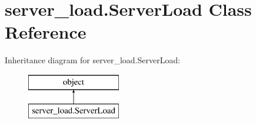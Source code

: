 \hypertarget{classserver__load_1_1_server_load}{\section{server\-\_\-load.\-Server\-Load Class Reference}
\label{classserver__load_1_1_server_load}
}
Inheritance diagram for server\-\_\-load.\-Server\-Load\-:\begin{figure}[H]
\begin{center}
\leavevmode
\includegraphics[height=2.000000cm]{classserver__load_1_1_server_load}
\end{center}
\end{figure}
